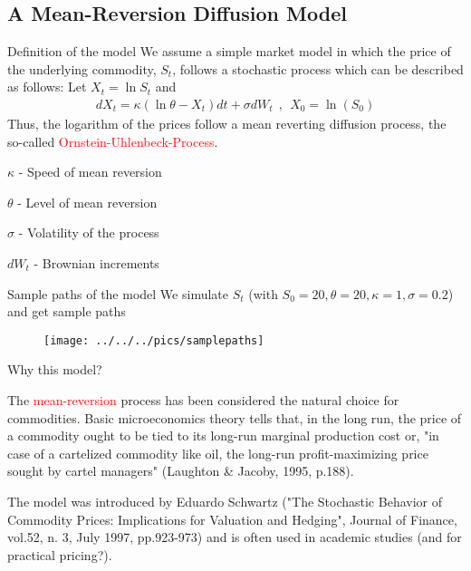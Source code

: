 {\subsection[Mean-Reversion Model]{A Mean-Reversion Diffusion Model}

{Definition of the model}
We assume a simple market model in which the price of the underlying commodity, $S_t$, follows a stochastic process which can be described as follows:
Let $X_t = \ln S_t$ and
\begin{align*}
	dX_t = \kappa (\ln \theta - X_t)dt + \sigma dW_t~~,~~X_0 = \ln(S_0)
\end{align*}
Thus, the logarithm of the prices follow a mean reverting diffusion process, the so-called \textcolor{red}{Ornstein-Uhlenbeck-Process}.\\
\item $\kappa$ - Speed of mean reversion
\item $\theta$ - Level of mean reversion
\item $\sigma$ - Volatility of the process
\item $dW_t$ - Brownian increments

{Sample paths of the model}
We simulate $S_t$ (with $S_0=20, \theta = 20, \kappa = 1, \sigma = 0.2$) and get sample paths
\begin{figure}
	\centering
		\texttt{[image: ../../../pics/samplepaths]}
	\label{fig:samplepahts}
\end{figure}

{Why this model?}
\item<1-> The \textcolor{red}{mean-reversion} process has been considered the natural choice for commodities. Basic microeconomics theory tells that, in the long run, the price of a commodity ought to be tied to its long-run marginal production cost or, "in case of a cartelized commodity like oil, the long-run profit-maximizing price sought by cartel managers" (Laughton \& Jacoby, 1995, p.188).
\item<2->  The model was introduced by Eduardo Schwartz ("The Stochastic Behavior of Commodity Prices: Implications for Valuation and Hedging", Journal of Finance, vol.52, n. 3, July 1997, pp.923-973) and is often used in academic studies (and for practical pricing?).

}
